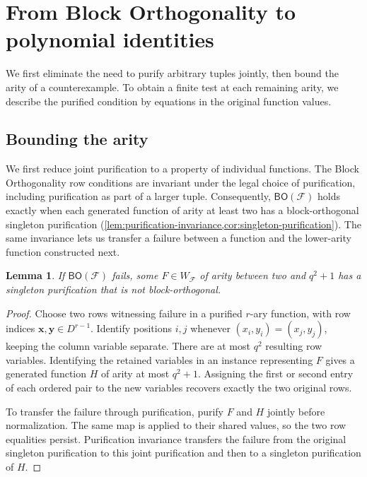 \documentclass[11pt,letterpaper,onecolumn]{article}
\theoremstyle{plain}
\newtheorem{lemma}[lemma]{Lemma}
\theoremstyle{definition}
\theoremstyle{remark}
\newcommand{\cF}{\mathcal F}
\newcommand{\BO}{\mathsf{BO}}
\begin{document}
\section{From Block Orthogonality to polynomial identities}
\label{s:sec:algebraic}

We first eliminate the need to purify arbitrary tuples jointly, then
bound the arity of a counterexample. To obtain a finite test at each
remaining arity, we describe the purified condition by equations in the
original function values.

\subsection{Bounding the arity}

We first reduce joint purification to a property of individual functions.
The Block Orthogonality row conditions are invariant under the legal
choice of purification, including purification as part of a larger
tuple. Consequently, $\BO(\cF)$ holds exactly when each generated
function of arity at least two has a block-orthogonal singleton
purification (\cref{lem:purification-invariance,cor:singleton-purification}).
The same invariance lets us transfer a failure between a function and
the lower-arity function constructed next.

\begin{lemma}
\label{s:lem:arity}
If $\BO(\cF)$ fails, some $F\in W_{\cF}$ of arity between two and
$q^2+1$ has a singleton purification that is not block-orthogonal.
\end{lemma}

\begin{proof}
Choose two rows witnessing failure in a purified $r$-ary function,
with row indices $\mathbf x,\mathbf y\in D^{r-1}$.
Identify positions $i,j$ whenever $(x_i,y_i)=(x_j,y_j)$, keeping the
column variable separate. There are at most $q^2$ resulting row
variables. Identifying the retained variables in an instance representing
$F$ gives a generated function $H$ of arity at most $q^2+1$.
Assigning the first or second entry of each ordered pair to the new
variables recovers exactly the two original rows.

To transfer the failure through purification, purify $F$ and $H$
jointly before normalization. The same map is applied to their shared
values, so the two row equalities persist. Purification invariance
transfers the failure from the original singleton purification to this
joint purification and then to a singleton purification of $H$.\qedhere
\end{proof}
\end{document}
